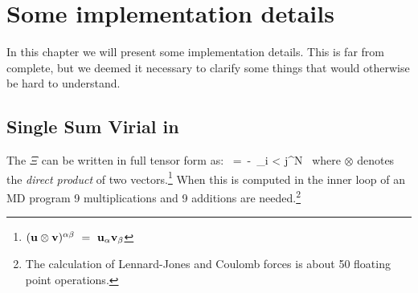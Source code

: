 %
%
%
%
%
%
%

\chapter{Some implementation details}
In this chapter we will present some implementation details. This is
far from complete, but we deemed it necessary to clarify some things
that would otherwise be hard to understand.

\section{Single Sum Virial in {\gromacs}}
\label{sec:virial}
The  $\Xi$ can be written in full tensor form as:
\beq
\Xi~=~-\half~\sum_{i < j}^N~\rvij\otimes\Fvij
\eeq
where $\otimes$ denotes the {\em direct product} of two vectors.\footnote
{$({\bf u}\otimes{\bf v})^{\ab}~=~{\bf u}_{\al}{\bf v}_{\be}$} When this is 
computed in the inner loop of an MD program 9 multiplications and 9
additions are needed.\footnote{The calculation of 
Lennard-Jones and Coulomb forces is about 50 floating point operations.}

